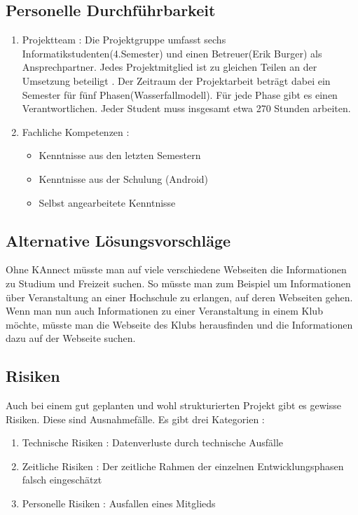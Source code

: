 \documentclass[parskip=full]{scrartcl}
\begin{document}
	\subsection{Personelle Durchführbarkeit}
	\begin{enumerate}[label={\alph*)}]
		\item Projektteam : Die Projektgruppe umfasst sechs Informatikstudenten(4.Semester) und einen Betreuer(Erik Burger) als Ansprechpartner.  Jedes Projektmitglied ist  zu gleichen Teilen an der Umsetzung beteiligt . Der Zeitraum der Projektarbeit beträgt dabei ein Semester für fünf Phasen(Wasserfallmodell). Für jede Phase gibt es einen  Verantwortlichen. Jeder  Student muss insgesamt etwa  270 Stunden arbeiten.
		\item Fachliche Kompetenzen : 
		\begin{itemize}
			\item Kenntnisse aus den letzten Semestern
			\item Kenntnisse aus der Schulung (Android)
			\item Selbst angearbeitete Kenntnisse
		\end{itemize}
	\end{enumerate}
	
	\subsection{Alternative Lösungsvorschläge}
Ohne KAnnect müsste man auf viele verschiedene Webseiten die Informationen zu Studium und Freizeit suchen. So müsste man zum Beispiel um Informationen über Veranstaltung an einer Hochschule zu erlangen, auf deren Webseiten gehen. Wenn man nun auch Informationen zu einer Veranstaltung in einem Klub möchte, müsste man die Webseite des Klubs herausfinden und die Informationen dazu auf der Webseite suchen.	

\newpage
	\subsection{Risiken} 
	Auch bei einem gut geplanten und wohl strukturierten Projekt gibt es gewisse Risiken. Diese sind Ausnahmefälle. Es gibt drei \gls{Kategorie}n :
	\begin{enumerate}[label={\alph*)}]
		\item Technische Risiken : Datenverluste durch technische Ausfälle
		\item Zeitliche Risiken : Der zeitliche Rahmen der einzelnen Entwicklungsphasen falsch eingeschätzt
		\item Personelle Risiken : Ausfallen eines Mitglieds
	\end{enumerate}
	\newpage
	
	
	\printnoidxglossaries
	
\end{document}
